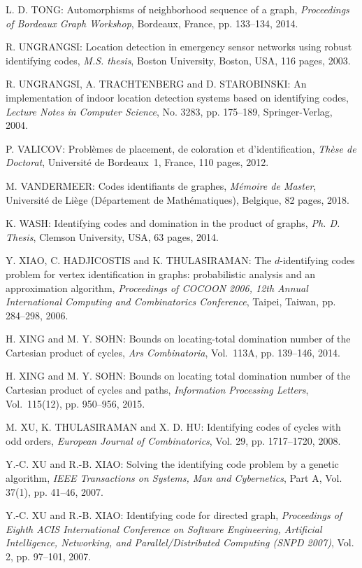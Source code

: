 \begin{thebibliography}{999}
L. D. TONG: Automorphisms of neighborhood sequence of a graph, {\it Proceedings of Bordeaux Graph Workshop}, Bordeaux, France, pp. 133--134, 2014.

R. UNGRANGSI: Location detection in emergency sensor networks using robust identifying codes, {\it M.S. thesis}, Boston University, Boston, USA, 116 pages, 2003.

R. UNGRANGSI, A. TRACHTENBERG and D. STAROBINSKI: An implementation of indoor location detection systems based on identifying codes, {\it Lecture Notes in Computer Science}, No. 3283, pp. 175--189, Springer-Verlag, 2004.

P. VALICOV: Probl\`emes de placement, de coloration et d'identification, {\it Th\`ese de Doctorat}, Universit\'e de Bordeaux~1, France, 110 pages, 2012.

M. VANDERMEER: Codes identifiants de graphes, {\it M\'emoire de Master}, Universit\'e de Li\`ege (D\'epartement de Math\'e\-matiques), Belgique, 82 pages, 2018.

K. WASH: Identifying codes and domination in the product of graphs, {\it Ph. D. Thesis}, Clemson University, USA, 63 pages, 2014.

Y. XIAO, C. HADJICOSTIS and K. THULASIRAMAN: The $d$-identifying codes problem for vertex identification in graphs: probabilistic analysis and an approximation algorithm, {\it Proceedings of COCOON 2006, 12th Annual International Computing and Combinatorics Conference}, Taipei, Taiwan, pp. 284--298, 2006.

H. XING and M. Y. SOHN: Bounds on locating-total domination number of the Cartesian product of cycles, {\it Ars Combinatoria}, Vol.~113A, pp. 139--146, 2014.

H. XING and M. Y. SOHN: Bounds on locating total domination number of the Cartesian product of cycles and paths, {\it Information Processing Letters}, Vol.~115(12), pp. 950--956, 2015.

M. XU, K. THULASIRAMAN and X. D. HU: Identifying codes of cycles with odd orders, {\it European Journal of Combinatorics}, Vol. 29, pp. 1717--1720, 2008.

Y.-C. XU and R.-B. XIAO: Solving the identifying code problem by a genetic algorithm, {\it IEEE Transactions on Systems, Man and Cybernetics}, Part A, Vol. 37(1), pp. 41--46, 2007.

Y.-C. XU and R.-B. XIAO: Identifying code for directed graph, {\it Proceedings of Eighth ACIS International Conference on Software Engineering, Artificial Intelligence, Networking, and Parallel/Distributed Computing (SNPD 2007)}, Vol. 2, pp. 97--101, 2007.


\end{thebibliography}
